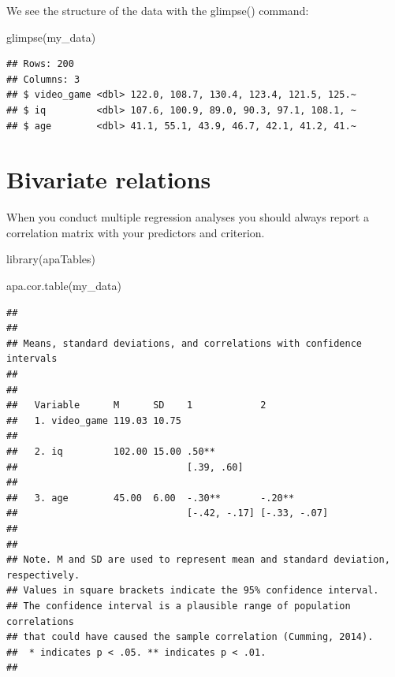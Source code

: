 \documentclass[
]{krantz}
\makeatletter
\newenvironment{Shaded}{\begin{snugshade}}{\end{snugshade}}
\newcommand{\FunctionTok}[1]{\textcolor[rgb]{0,0,0}{#1}}
\newcommand{\NormalTok}[1]{#1}
\newenvironment{kframe}{%
\medskip{}
\setlength{\fboxsep}{.8em}
 \def\at@end@of@kframe{}%
 \ifinner\ifhmode%
  \def\at@end@of@kframe{\end{minipage}}%
  \begin{minipage}{\columnwidth}%
 \fi\fi%
 \def\FrameCommand##1{\hskip\@totalleftmargin \hskip-\fboxsep
 \colorbox{shadecolor}{##1}\hskip-\fboxsep
     \hskip-\linewidth \hskip-\@totalleftmargin \hskip\columnwidth}%
 \MakeFramed {\advance\hsize-\width
   \@totalleftmargin\z@ \linewidth\hsize
   \@setminipage}}%
 {\par\unskip\endMakeFramed%
 \at@end@of@kframe}
\renewenvironment{Shaded}{\begin{kframe}}{\end{kframe}}
\makeatother
\begin{document}
We see the structure of the data with the glimpse() command:

\begin{Shaded}
\begin{Highlighting}[]
\FunctionTok{glimpse}\NormalTok{(my\_data)}
\end{Highlighting}
\end{Shaded}

\begin{verbatim}
## Rows: 200
## Columns: 3
## $ video_game <dbl> 122.0, 108.7, 130.4, 123.4, 121.5, 125.~
## $ iq         <dbl> 107.6, 100.9, 89.0, 90.3, 97.1, 108.1, ~
## $ age        <dbl> 41.1, 55.1, 43.9, 46.7, 42.1, 41.2, 41.~
\end{verbatim}

\hypertarget{bivariate-relations}{%
\section{Bivariate relations}\label{bivariate-relations}}

When you conduct multiple regression analyses you should always report a correlation matrix with your predictors and criterion.

\begin{Shaded}
\begin{Highlighting}[]
\FunctionTok{library}\NormalTok{(apaTables)}

\FunctionTok{apa.cor.table}\NormalTok{(my\_data)}
\end{Highlighting}
\end{Shaded}

\begin{verbatim}
## 
## 
## Means, standard deviations, and correlations with confidence intervals
##  
## 
##   Variable      M      SD    1            2           
##   1. video_game 119.03 10.75                          
##                                                       
##   2. iq         102.00 15.00 .50**                    
##                              [.39, .60]               
##                                                       
##   3. age        45.00  6.00  -.30**       -.20**      
##                              [-.42, -.17] [-.33, -.07]
##                                                       
## 
## Note. M and SD are used to represent mean and standard deviation, respectively.
## Values in square brackets indicate the 95% confidence interval.
## The confidence interval is a plausible range of population correlations 
## that could have caused the sample correlation (Cumming, 2014).
##  * indicates p < .05. ** indicates p < .01.
## 
\end{verbatim}
\end{document}
